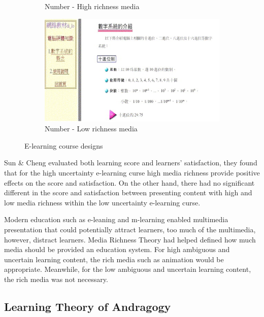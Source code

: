 \begin{figure}[!hbt]
\begin{subfigure}{0.45\textwidth}
        \caption{Number - High richness media }
    \end{subfigure}\hspace{0.05\textwidth}
\begin{subfigure}{0.45\textwidth}
        \includegraphics[width=\textwidth]{media4}
        \caption{Number - Low richness media }
    \end{subfigure}
    \caption{E-learning course designs \cite{sun2007design}}
\end{figure}

Sun \& Cheng \cite{sun2007design} evaluated both learning score and learners' satisfaction, they found that for the high uncertainty e-learning curse high media richness provide positive effects on the score and satisfaction. On the other hand, there had no significant different in the score and satisfaction between presenting content with high and low media richness within the low uncertainty e-learning curse. 

Modern education such as e-leaning and m-learning enabled multimedia presentation that could potentially attract learners, too much of the multimedia, however, distract learners. Media Richness Theory had helped defined how much media should be provided an education system. For high ambiguous and uncertain learning content, the rich media such as animation would be appropriate. Meanwhile, for the low ambiguous and uncertain learning content, the rich media was not necessary. 


\subsection{Learning Theory of Andragogy} 

